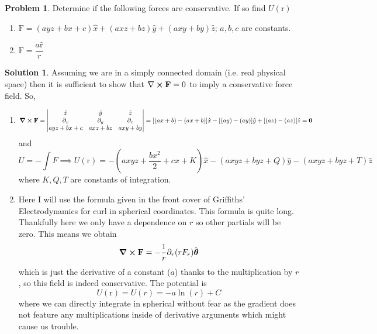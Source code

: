 \documentclass[10pt]{article}
\theoremstyle{definition}
\newtheorem{problem}{Problem}
\newtheorem{soln}{Solution}
\newcommand{\ux}{\hat{x}}
\newcommand{\uy}{\hat{y}}
\newcommand{\uz}{\hat{z}}
\newcommand{\uv}[1]{\hat{\bv{{#1}}}}
\newcommand{\bv}[1]{\bm{\mathrm{#1}}}
\begin{document}
\begin{problem}
Determine if the following forces are conservative. If so find $U(\bv{r})$
\begin{enumerate}[label=(\alph*)]
  \item $\bv{F}=(ayz+bx+c)\ux+(axz+bz)\uy+(axy+by)\uz$; $a,b,c$ are constants.
  \item $\bv{F}=\dfrac{a\uv{r}}{r}$
\end{enumerate}
\end{problem}
\begin{soln}Assuming we are in a simply connected domain (i.e. real physical space) then it is sufficient to show that $\nabla\cross\bv{F}=0$ to imply a
  conservative force field. So,
  \begin{enumerate}[label=(\alph*)]
    \item $$\curl{\bv{F}}=
            \begin{vmatrix}
              \ux        & \uy        & \uz        \\
              \partial_x & \partial_y & \partial_z \\
              ayz+bx+c   & axz+bz     & axy+by
            \end{vmatrix}=[(ax+b)-(ax+b)]\ux-[(ay)-(ay)]\uy+[(az)-(az)]\uz=\bv{0}
          $$
          and 
          $$U=-\int F\implies U(\bv{r})=-(axyz+\frac{bx^2}{2}+cx+K)\ux-(axyz+byz+Q)\uy-(axyz+byz+T)\uz$$
          where $K,Q,T$ are constants of integration.
    \item Here I will use the formula given in the front cover of Griffiths' Electrodynamics for curl in spherical coordinates. This formula is quite long. Thankfully here
    we only have a dependence on $r$ so other partials will be zero. This means we obtain 
    $$\curl{\bv{F}}=-\frac{1}{r}\partial_r(rF_r)\uv{\theta}$$
    which is just the derivative of a constant ($a$) thanks to the multiplication by $r$, so this field is indeed conservative. The potential is 
    $$U(\bv{r})=U(r)=-a\ln(r)+C$$
    where we can directly integrate in spherical without fear as the gradient does not feature any multiplications inside of derivative arguments which might cause us trouble.
  \end{enumerate}
\end{soln}
\end{document}
